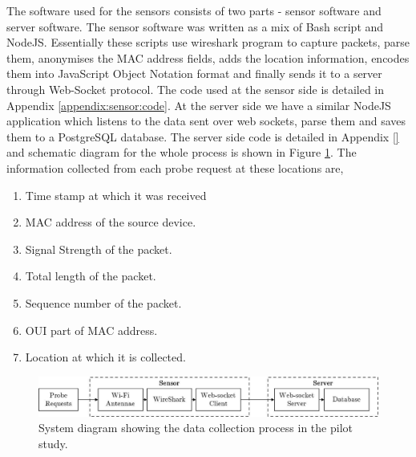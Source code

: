 The software used for the sensors consists of two parts - sensor software and server software.
The sensor software was written as a mix of Bash script and NodeJS.
Essentially these scripts use wireshark program to capture packets, parse them, anonymises the MAC address fields, adds the location information, encodes them into JavaScript Object Notation format and finally sends it to a server through Web-Socket protocol.
The code used at the sensor side is detailed in Appendix \ref{appendix:sensor:code}.
At the server side we have a similar NodeJS application which listens to the data sent over web sockets, parse them and saves them to a PostgreSQL database.
The server side code is detailed in Appendix \ref{} and schematic diagram for the whole process is shown in Figure \ref{figure:collection:pilot:schema}.
The information collected from each probe request at these locations are,

\begin{enumerate}[leftmargin=4em, rightmargin=2em]
  \itemsep-0.25em
  \item Time stamp at which it was received
  \item MAC address of the source device.
  \item Signal Strength of the packet.
  \item Total length of the packet.
  \item Sequence number of the packet.
  \item OUI part of MAC address.
  \item Location at which it is collected.
\end{enumerate}

\begin{figure}
  \includegraphics{images/pilot-study-system.jpeg}
  \caption{System diagram showing the data collection process in the pilot study.}
  \label{figure:collection:pilot:schema}
\end{figure}

